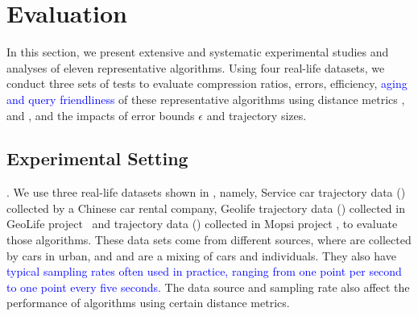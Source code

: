 \section{Evaluation} %
\label{sec-exp}
In this section, we present extensive and systematic experimental studies and analyses of eleven representative \lsa algorithms.
Using four real-life datasets, we conduct three sets of tests to evaluate compression ratios, errors, efficiency, \textcolor{blue}{aging and query friendliness} of these representative algorithms using distance metrics \ped, \sed and \dad, and the impacts of error bounds $\epsilon$ and trajectory sizes.
%

\subsection{Experimental Setting}

.
We use three real-life datasets shown in , namely, Service car trajectory data (\ucar) collected by a Chinese car rental company, Geolife trajectory data (\geolife) collected in GeoLife project~\cite{Web:Geolife} and \mopsi trajectory data (\mopsi) collected in Mopsi project \cite{Web:Mopsi}, to evaluate those \lsa algorithms.
These data sets come from different sources, where \ucar are collected by cars in urban, and \geolife and \mopsi are a mixing of cars and individuals. They also have \textcolor{blue} {typical sampling rates often used in practice, ranging from one point per second to one point every five seconds.}
The data source and sampling rate also affect the performance of \lsa algorithms using certain distance metrics.

